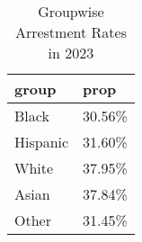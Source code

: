 \begin{table}[ht]
\centering
\begin{tabular}{ll}
  \hline
group & prop \\ 
  \hline
Black & 30.56\% \\ 
  Hispanic & 31.60\% \\ 
  White & 37.95\% \\ 
  Asian & 37.84\% \\ 
  Other & 31.45\% \\ 
   \hline
\end{tabular}
\caption{Groupwise Arrestment Rates in 2023} 
\label{tab:groupwise_arrestment_rates_2023}
\end{table}
